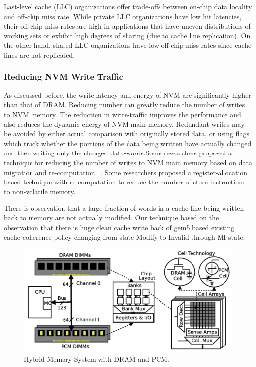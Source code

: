 Last-level cache (LLC) organizations offer trade-offs between on-chip data locality and off-chip miss rate. While private LLC organizations have low hit latencies, their off-chip miss rates are high in applications that have uneven distributions of working sets or exhibit high degrees of sharing (due to cache line replication). On the other hand, shared LLC organizations have low off-chip miss rates since cache lines are not replicated.

\subsubsection{Reducing NVM Write Traffic} 
As discussed before, the write latency and energy of NVM are significantly higher than that of DRAM. Reducing number can greatly reduce the number of writes to NVM memory. The reduction in write-traffic improves the performance and also reduces the dynamic energy of NVM main memory. Redundant writes may be avoided by either actual comparison with originally stored data, or using flags which track whether the portions of the data being written have actually changed and then writing only the changed data-words.Some researchers proposed a technique for reducing the number of writes to NVM main memory based on data migration and re-computation ~\cite{6844484}. Some researchers proposed a register-allocation based technique with re-computation to reduce the number of store instructions to non-volatile memory.

There is observation that a large fraction of words in a cache line being written back to memory are not actually modified. Our technique based on the observation that there is huge clean cache write back of gem5 based existing cache coherence policy changing from state Modify to Invalid through MI state. 


\begin{figure}[t]
\centering
\includegraphics[width=\columnwidth]{figs/hybrid}
\caption{Hybrid Memory System with DRAM and PCM.}
\label{fig:hybrid}
\end{figure}







